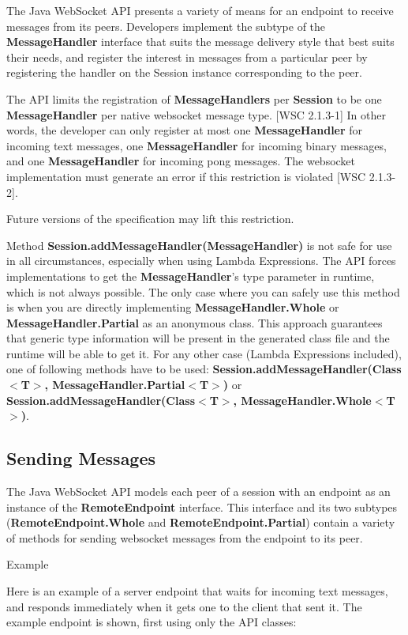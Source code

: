 The Java WebSocket API presents a variety of means for an endpoint to receive messages from its peers. Developers implement the subtype of the \textbf{MessageHandler} interface that suits the message delivery style that best suits their needs, and register the interest in messages from a particular peer by registering the handler on the Session instance corresponding to the peer.

The API limits the registration of \textbf{MessageHandlers} per \textbf{Session} to be one \textbf{MessageHandler} per native websocket message type. [WSC 2.1.3-1] In other words, the developer can only register at most one \textbf{MessageHandler} for incoming text messages, one \textbf{MessageHandler} for incoming binary messages, and one \textbf{MessageHandler} for incoming pong messages. The websocket implementation must generate an error if this restriction is violated [WSC 2.1.3-2].

Future versions of the specification may lift this restriction.

Method \textbf{Session.addMessageHandler(MessageHandler)} is not safe for use in all circumstances, especially when using Lambda Expressions. The API forces implementations to get the \textbf{MessageHandler}'s type parameter in runtime, which is not always possible.  The only case where you can safely use this method is when you are directly implementing \textbf{MessageHandler.Whole} or \textbf{MessageHandler.Partial} as an anonymous class. This approach guarantees that generic type information will be present in the generated class file and the runtime will be able to get it. For any other case (Lambda Expressions included), one of following methods have to be used: \textbf{Session.addMessageHandler(Class$<$T$>$,  MessageHandler.Partial$<$T$>$)} or \textbf{Session.addMessageHandler(Class$<$T$>$,  MessageHandler.Whole$<$T$>$)}.

\subsection{Sending Messages}

The Java WebSocket API models each peer of a session with an endpoint as an instance of the \textbf{RemoteEndpoint} interface. This interface and its two subtypes (\textbf{RemoteEndpoint.Whole} and \textbf{RemoteEndpoint.Partial}) contain a variety of methods for sending websocket messages from the endpoint to its peer.

Example

Here is an example of a server endpoint that waits for incoming text messages, and responds immediately when it gets one to the client that sent it. The example endpoint is shown, first using only the API classes:

